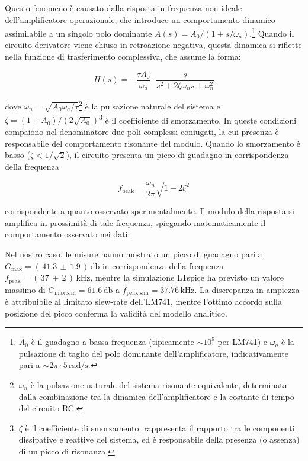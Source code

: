 \documentclass[a4paper,12pt]{article}
\begin{document}
Questo fenomeno è causato dalla risposta in frequenza non ideale dell’amplificatore operazionale, che introduce un comportamento dinamico assimilabile a un singolo polo dominante \( A(s) = A_0/(1 + s/\omega_a) \).\footnote{%
\( A_0 \) è il guadagno a bassa frequenza (tipicamente \( \sim 10^5 \) per LM741) e \( \omega_a \) è la pulsazione di taglio del polo dominante dell’amplificatore, indicativamente pari a \( \sim 2\pi \cdot 5\,\si{\radian\per\second} \).%
}
Quando il circuito derivatore viene chiuso in retroazione negativa, questa dinamica si riflette nella funzione di trasferimento complessiva, che assume la forma:

\[
H(s) = -\frac{\tau A_0}{\omega_a} \cdot \frac{s}{s^2 + 2\zeta\omega_n s + \omega_n^2}
\]

dove \( \omega_n = \sqrt{A_0 \omega_a / \tau} \)\footnote{%
\( \omega_n \) è la pulsazione naturale del sistema risonante equivalente, determinata dalla combinazione tra la dinamica dell'amplificatore e la costante di tempo del circuito RC.%
}
è la pulsazione naturale del sistema e \( \zeta = (1 + A_0)/(2\sqrt{A_0}) \)\footnote{%
\( \zeta \) è il coefficiente di smorzamento: rappresenta il rapporto tra le componenti dissipative e reattive del sistema, ed è responsabile della presenza (o assenza) di un picco di risonanza.%
}
è il coefficiente di smorzamento. In queste condizioni compaiono nel denominatore due poli complessi coniugati, la cui presenza è responsabile del comportamento risonante del modulo. Quando lo smorzamento è basso (\( \zeta < 1/\sqrt{2} \)), il circuito presenta un picco di guadagno in corrispondenza della frequenza

\[
f_{\text{peak}} = \frac{\omega_n}{2\pi} \sqrt{1 - 2\zeta^2}
\]

corrispondente a quanto osservato sperimentalmente. Il modulo della risposta si amplifica in prossimità di tale frequenza, spiegando matematicamente il comportamento osservato nei dati.

Nel nostro caso, le misure hanno mostrato un picco di guadagno pari a \( G_{\text{max}} = (\,41.3\, \pm\, 1.9\,)\,\si{\decibel} \) in corrispondenza della frequenza \( f_{\text{peak}} = (\,37\, \pm\, 2\,)\,\si{\kilo\hertz} \), mentre la simulazione LTspice ha previsto un valore massimo di \( G_{\text{max,sim}} = 61.6\,\si{\decibel} \) a \( f_{\text{peak,sim}} = 37.76\,\si{\kilo\hertz} \). La discrepanza in ampiezza è attribuibile al limitato slew-rate dell’LM741, mentre l’ottimo accordo sulla posizione del picco conferma la validità del modello analitico.
\end{document}
